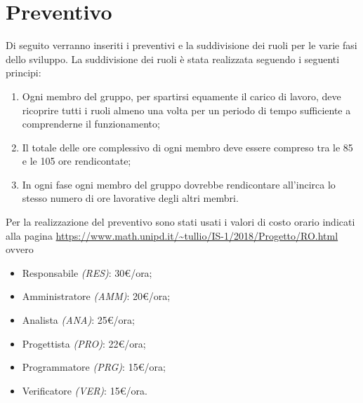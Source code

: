 	\section{Preventivo}
	Di seguito verranno inseriti i preventivi e la suddivisione dei ruoli per le varie fasi dello sviluppo. La suddivisione dei ruoli è stata realizzata seguendo i seguenti principi:
	\begin{enumerate}
		\item Ogni membro del gruppo, per spartirsi equamente il carico di lavoro, deve ricoprire tutti i ruoli almeno una volta per un periodo di tempo sufficiente a comprenderne il funzionamento;
		\item Il totale delle ore complessivo di ogni membro deve essere compreso tra le 85 e le 105 ore rendicontate;
		\item In ogni fase ogni membro del gruppo dovrebbe rendicontare all'incirca lo stesso numero di ore lavorative degli altri membri.
	\end{enumerate} 
	Per la realizzazione del preventivo sono stati usati i valori di costo orario indicati alla pagina \url{https://www.math.unipd.it/~tullio/IS-1/2018/Progetto/RO.html} ovvero
	\begin{itemize}
		\item Responsabile \textit{(RES)}: 30\euro/ora;
		\item Amministratore \textit{(AMM)}: 20\euro/ora;
		\item Analista \textit{(ANA)}: 25\euro/ora;
		\item Progettista \textit{(PRO)}: 22\euro/ora;
		\item Programmatore \textit{(PRG)}: 15\euro/ora;
		\item Verificatore \textit{(VER)}: 15\euro/ora.
	\end{itemize}	
	
	
	\newpage
	
	\newpage
	
	\newpage
	
	\newpage
	
